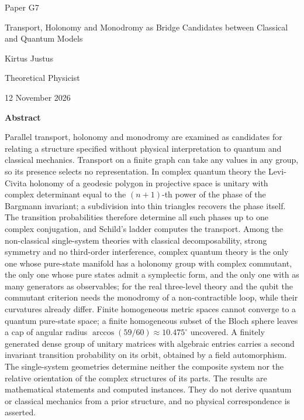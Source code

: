 \documentclass[11pt,a4paper]{article}
\begin{document}
\begin{titlepage}
{\small\sffamily \ProgramTitle\hfill Paper G7\par}
\vspace*{6mm}
{\LARGE\bfseries\raggedright{} Transport, Holonomy and Monodromy as Bridge Candidates between Classical and Quantum Models\par}
\vspace{8mm}
{\large Kirtus Justus\par}
\vspace{1mm}
Theoretical Physicist\par
\AuthorLocation\par
\vspace{2mm}
12 November 2026\par
\vspace{7mm}
\textbf{Abstract}\par
Parallel transport, holonomy and monodromy are examined as candidates for relating a structure specified without physical interpretation to quantum and classical mechanics. Transport on a finite graph can take any values in any group, so its presence selects no representation. In complex quantum theory the Levi-Civita holonomy of a geodesic polygon in projective space is unitary with complex determinant equal to the $(n+1)$-th power of the phase of the Bargmann invariant; a subdivision into thin triangles recovers the phase itself. The transition probabilities therefore determine all such phases up to one complex conjugation, and Schild's ladder computes the transport. Among the non-classical single-system theories with classical decomposability, strong symmetry and no third-order interference, complex quantum theory is the only one whose pure-state manifold has a holonomy group with complex commutant, the only one whose pure states admit a symplectic form, and the only one with as many generators as observables; for the real three-level theory and the qubit the commutant criterion needs the monodromy of a non-contractible loop, while their curvatures already differ. Finite homogeneous metric spaces cannot converge to a quantum pure-state space; a finite homogeneous subset of the Bloch sphere leaves a cap of angular radius $\arccos(59/60)\approx10.475^\circ$ uncovered. A finitely generated dense group of unitary matrices with algebraic entries carries a second invariant transition probability on its orbit, obtained by a field automorphism. The single-system geometries determine neither the composite system nor the relative orientation of the complex structures of its parts. The results are mathematical statements and computed instances. They do not derive quantum or classical mechanics from a prior structure, and no physical correspondence is asserted.\par

\end{titlepage}
\end{document}
